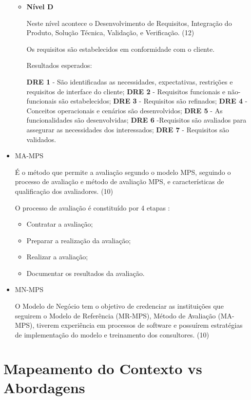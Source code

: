 \begin{itemize}
\begin{itemize}
\item \textbf{Nível D}

Neste nível acontece o Desenvolvimento de Requisitos, Integração do Produto, Solução Técnica, Validação, e Verificação. (12)

Os requisitos são estabelecidos em conformidade com o cliente.

Resultados esperados:

\textbf{DRE 1} - São identificadas as necessidades, expectativas, restrições e requisitos de interface do cliente;
\textbf{DRE 2} - Requisitos funcionais e não-funcionais são estabelecidos;
\textbf{DRE 3} - Requisitos são refinados;
\textbf{DRE 4} - Conceitos operacionais e cenários são desenvolvidos;
\textbf{DRE 5} - As funcionalidades são desenvolvidas;
\textbf{DRE 6} -Requisitos são avaliados para assegurar as necessidades dos interessados;
\textbf{DRE 7} - Requisitos são validados.

\end{itemize}

\item {MA-MPS}

É o método que permite a avaliação segundo o modelo MPS, seguindo o processo de avaliação e método de avaliação MPS, e características de qualificação dos avaliadores. (10)

O processo de avaliação é constituído por 4 etapas :

\begin{itemize}
\item Contratar a avaliação;
\item Preparar a realização da avaliação;
\item Realizar a avaliação;
\item Documentar os resultados da avaliação.
\end{itemize}

\item {MN-MPS}

O Modelo de Negócio tem o objetivo de credenciar as instituições que seguirem o Modelo de Referência (MR-MPS), Método de Avaliação (MA-MPS), tiverem experiência em processos de software e possuírem estratégias de implementação do modelo e treinamento dos consultores. (10)


\end{itemize}



\section {Mapeamento do Contexto vs Abordagens}
